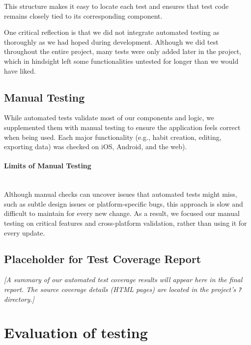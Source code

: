 This structure makes it easy to locate each test and ensures that test code remains closely tied to its corresponding component.

One critical reflection is that we did not integrate automated testing as thoroughly as we had hoped during development. Although we did test throughout the entire project, many tests were only added later in the project, which in hindsight left some functionalities untested for longer than we would have liked.

\subsection{Manual Testing}

While automated tests validate most of our components and logic, we supplemented them with manual testing to ensure the application feels correct when being used. Each major functionality (e.g., habit creation, editing, exporting data) was checked on iOS, Android, and the web).

\paragraph{Limits of Manual Testing}\mbox{}\\
Although manual checks can uncover issues that automated tests might miss, such as subtle design issues or platform-specific bugs, this approach is slow and difficult to maintain for every new change. As a result, we focused our manual testing on critical features and cross-platform validation, rather than using it for every update.

\subsection{Placeholder for Test Coverage Report} \label{sect:test-coverage} \vspace{12pt} \noindent \textit{[A summary of our automated test coverage results will appear here in the final report. The source coverage details (HTML pages) are located in the project’s \texttt{?} directory.]}


\section{Evaluation of testing} \label{sect:testing:evaluation}

